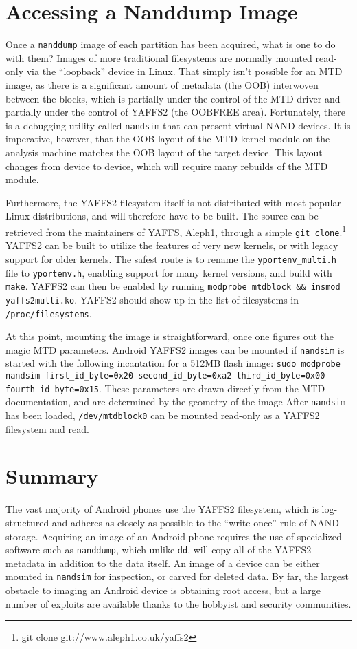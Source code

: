 \section{Accessing a Nanddump Image}

Once a \texttt{nanddump} image of each partition has been acquired, what is one to do with them?  Images of more traditional
filesystems are normally mounted read-only via the ``loopback'' device in Linux.  That simply isn't possible for an MTD image, as there
is a significant amount of metadata (the OOB) interwoven between the blocks, which is partially under the control of the MTD driver
and partially under the control of YAFFS2 (the OOBFREE area).  Fortunately, there is a debugging utility called \texttt{nandsim}
that can present virtual NAND devices.  It is imperative, however, that the OOB layout of the MTD kernel module on the analysis
machine matches the OOB layout of the target device.  This layout changes from device to device, which will require many rebuilds of
the MTD module. 

Furthermore, the YAFFS2 filesystem itself is not distributed with most popular Linux distributions, and will therefore have to be built.
The source can be retrieved from the maintainers of YAFFS, Aleph1, through a simple \texttt{git clone}.\footnote{git clone git://www.aleph1.co.uk/yaffs2\cite{gityaffs}} YAFFS2 can be built to utilize the features of very new kernels, or with legacy support for older kernels. 
The safest route is to rename the \texttt{yportenv\_multi.h} file to \texttt{yportenv.h}, enabling support for many kernel versions, and build with \texttt{make}. 
YAFFS2 can then be enabled by running \texttt{modprobe mtdblock \&\& insmod yaffs2multi.ko}. 
YAFFS2 should show up in the list of filesystems in \texttt{/proc/filesystems}.

At this point, mounting the image is straightforward, once one figures out the magic MTD parameters.
Android YAFFS2 images can be mounted if \texttt{nandsim} is started with the following incantation for a 512MB flash image:
\texttt{sudo modprobe nandsim first\_id\_byte=0x20 second\_id\_byte=0xa2 third\_id\_byte=0x00 fourth\_id\_byte=0x15}.
These parameters are drawn directly from the MTD documentation, and are determined by the geometry of the image \cite{mtdfaq}
After \texttt{nandsim} has been loaded, \texttt{/dev/mtdblock0} can be mounted read-only as a YAFFS2 filesystem and read.

\section{Summary}

The vast majority of Android phones use the YAFFS2 filesystem, which is log-structured and adheres as closely as possible to the
``write-once'' rule of NAND storage. Acquiring an image of an Android phone requires the use of specialized software such as
\texttt{nanddump}, which unlike \texttt{dd}, will copy all of the YAFFS2 metadata in addition to the data itself. An image of a
device can be either mounted in \texttt{nandsim} for inspection, or carved for deleted data. By far, the largest obstacle to imaging
an Android device is obtaining root access, but a large number of exploits are available thanks to the hobbyist and security
communities.
